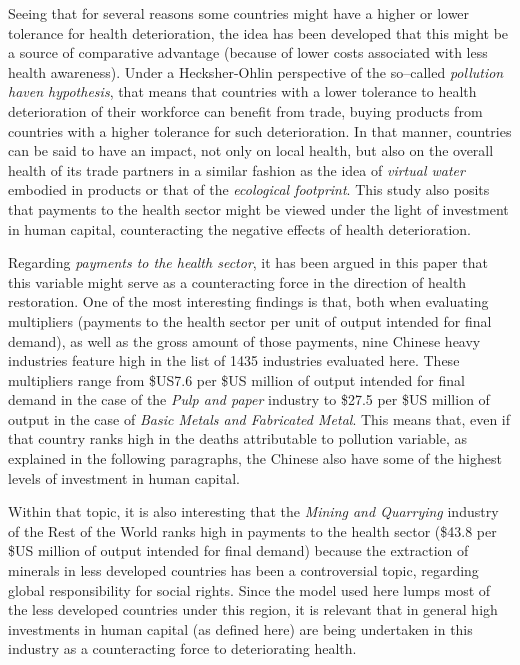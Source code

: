 \documentclass[a4paper,12pt]{article}
\begin{document}
Seeing that for several reasons some countries might have a higher or lower tolerance for health deterioration, the idea has been developed that this might be a source of comparative advantage (because of lower costs associated with less health awareness). Under a Hecksher-Ohlin perspective of the so--called \textit{pollution haven hypothesis}, that means that countries with a lower tolerance to health deterioration of their workforce can benefit from trade, buying products from countries with a higher tolerance for such deterioration. In that manner, countries can be said to have an impact, not only on local health, but also on the overall health of its trade partners in a similar fashion as the idea of \textit{virtual water} embodied in products or that of the \textit{ecological footprint}. This study also posits that payments to the health sector might be viewed under the light of investment in human capital, counteracting the negative effects of health deterioration.

Regarding \textit{payments to the health sector}, it has been argued in this paper that this variable might serve as a counteracting force in the direction of health restoration. One of the most interesting findings is that, both when evaluating multipliers (payments to the health sector per unit of output intended for final demand), as well as the gross amount of those payments, nine Chinese heavy industries feature high in the list of 1435 industries evaluated here. These multipliers range from \$US7.6 per \$US million of output intended for final demand in the case of the \textit{Pulp and paper} industry to \$27.5 per \$US million of output in the case of \textit{Basic Metals and Fabricated Metal}. This means that, even if that country ranks high in the deaths attributable to pollution variable, as explained in the following paragraphs, the Chinese also have some of the highest levels of investment in human capital. 

Within that topic, it is also interesting that the \textit{Mining and Quarrying} industry of the Rest of the World ranks high in payments to the health sector (\$43.8 per \$US million of output intended for final demand) because the extraction of minerals in less developed countries has been a controversial topic, regarding global responsibility for social rights. Since the model used here lumps most of the less developed countries under this region, it is relevant that in general high investments in human capital (as defined here) are being undertaken in this industry as a counteracting force to deteriorating health.
\end{document}
